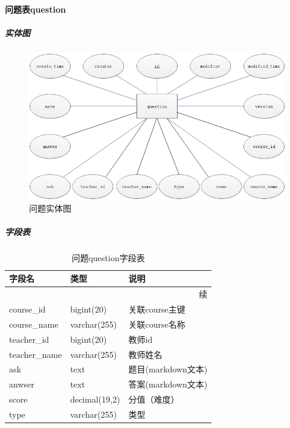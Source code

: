\documentclass[titlepage,UTF8,linespread=1.5]{ctexart}
\begin{document}
\paragraph{问题表question}
\subparagraph{实体图}
\begin{figure}[H]
    \centering
    \includegraphics[width=140mm]{entity-question.png}
    \caption{问题实体图}
    \label{fig:entity-question}
\end{figure}
\subparagraph{字段表}
\begin{longtable}{|p{10em}|p{6em}|p{15em}|}
    \caption{问题question字段表}\label{tab:table_question} \\\hline
    字段名         & 类型          & 说明                  \\\hline
    \endfirsthead
    \multicolumn{3}{r}{{续\tablename\thetable{}}}          \\\hline
    \endhead
    course\_id     & bigint(20)    & 关联course主键        \\\hline
    course\_name   & varchar(255)  & 关联course名称        \\\hline
    teacher\_id    & bigint(20)    & 教师id                \\\hline
    teacher\_name  & varchar(255)  & 教师姓名              \\\hline
    ask            & text          & 题目(markdown文本)    \\\hline
    anwser         & text          & 答案(markdown文本)    \\\hline
    score          & decimal(19,2) & 分值（难度）          \\\hline
    type           & varchar(255)  & 类型                  \\\hline
\end{longtable}\par
\end{document}
